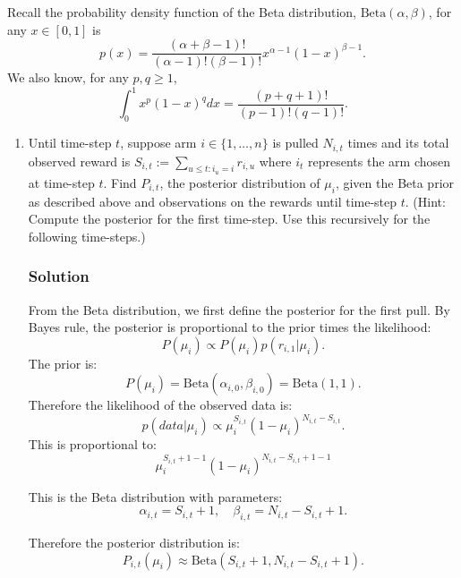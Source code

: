 \documentclass{article}
\begin{document}
Recall the probability density function of the Beta distribution, $\text{Beta}(\alpha, \beta)$, for any $x \in [0, 1]$ is
\[
p(x) = \frac{(\alpha + \beta - 1)!}{(\alpha - 1)!(\beta - 1)!} x^{\alpha-1} (1 - x)^{\beta-1}.
\]
We also know, for any $p, q \geq 1$,
\[
\int_0^1 x^p (1 - x)^q dx = \frac{(p + q + 1)!}{(p - 1)!(q - 1)!}.
\]

\begin{enumerate}[label=(\alph*)]
    \item Until time-step $t$, suppose arm $i \in \{1, \ldots, n\}$ is pulled $N_{i,t}$ times and its total observed reward is $S_{i,t} := \sum_{u \leq t: i_u = i} r_{i,u}$ where $i_t$ represents the arm chosen at time-step $t$. Find $P_{i,t}$, the posterior distribution of $\mu_i$, given the Beta prior as described above and observations on the rewards until time-step $t$. (Hint: Compute the posterior for the first time-step. Use this recursively for the following time-steps.)
    \subsubsection*{Solution}
    From the Beta distribution, we first define the posterior for the first pull.
    By Bayes rule, the posterior is proportional to the prior times the likelihood:
    \[
    P(\mu_i) \propto P(\mu_i) p(r_{i,1} | \mu_i).
    \]
    The prior is:
    \[
    P(\mu_i) = \text{Beta}(\alpha_{i,0}, \beta_{i,0}) = \text{Beta}(1, 1).
    \]
    Therefore the likelihood of the observed data is:
    \[
    p(data | \mu_i) \propto \mu_i^{S_{i,t}} (1 - \mu_i)^{N_{i,t} - S_{i,t}}.
    \]
    This is proportional to:
    \[
    \mu_i^{S_{i,t}+ 1 -1} (1 - \mu_i)^{N_{i,t} - S_{i,t} + 1 - 1} 
    \]

    This is the Beta distribution with parameters:
    \[
    \alpha_{i,t} = S_{i,t} + 1, \quad \beta_{i,t} = N_{i,t} - S_{i,t} + 1.
    \]

    Therefore the posterior distribution is:
    \[
    P_{i,t}(\mu_i) \approx \text{Beta}(S_{i,t} + 1, N_{i,t} - S_{i,t} + 1).
    \]





\end{enumerate}
\end{document}
